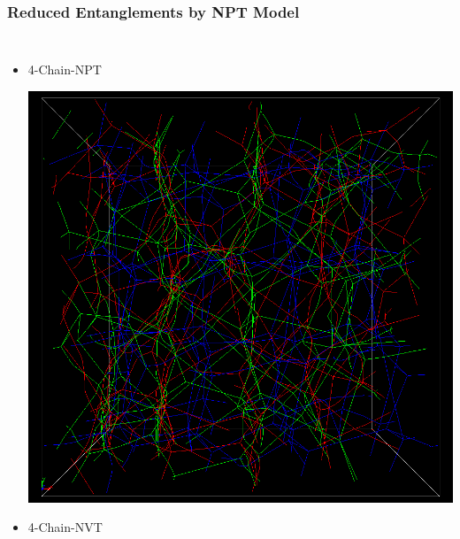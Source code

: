 \documentclass[12pt, dvipdfmx]{beamer}
\begin{document}
\begin{frame}
    \frametitle{Reduced Entanglements by NPT Model}
        \vspace{-3mm}
		\begin{columns}[T, onlytextwidth]
                \small
				\begin{itemize}
					\item 4-Chain-\alert{NPT}
					
					\includegraphics[width=.62\textwidth]{NPT_PPA.png}
					\item 4-Chain-NVT
					

\end{itemize}
\end{columns}
\end{frame}
\end{document}
